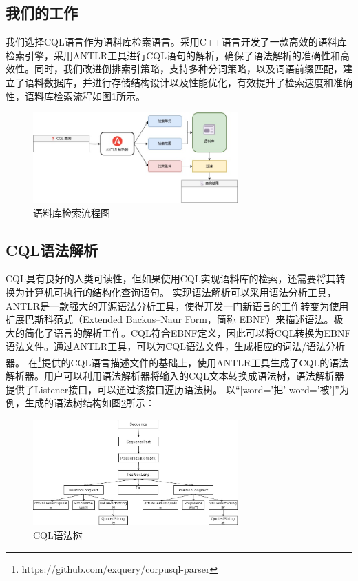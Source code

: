 \documentclass[11pt]{article}
\begin{document}
\begin{CJK*}{UTF8}{gbsn}
\section{我们的工作}

我们选择CQL语言作为语料库检索语言。采用C++语言开发了一款高效的语料库检索引擎，采用ANTLR工具进行CQL语句的解析，确保了语法解析的准确性和高效性。同时，我们改进倒排索引策略，支持多种分词策略，以及词语前缀匹配，建立了语料数据库，并进行存储结构设计以及性能优化，有效提升了检索速度和准确性，语料库检索流程如图\ref{fig:liucheng}所示。

\begin{figure}[!h]
	\centering
	\includegraphics[width=0.7\textwidth]{image/liuchengtu.jpg}
	\caption{语料库检索流程图}
	\label{fig:liucheng}
\end{figure}

\subsection{CQL语法解析}

CQL具有良好的人类可读性，但如果使用CQL实现语料库的检索，还需要将其转换为计算机可执行的结构化查询语句。
实现语法解析可以采用语法分析工具，ANTLR是一款强大的开源语法分析工具，使得开发一门新语言的工作转变为使用扩展巴斯科范式（Extended Backus–Naur Form，简称 EBNF）来描述语法。极大的简化了语言的解析工作。CQL符合EBNF定义，因此可以将CQL转换为EBNF语法文件。通过ANTLR工具，可以为CQL语法文件，生成相应的词法/语法分析器。
在\footnote[1]{https://github.com/exquery/corpusql-parser}提供的CQL语言描述文件的基础上，使用ANTLR工具生成了CQL的语法解析器。用户可以利用语法解析器将输入的CQL文本转换成语法树，语法解析器提供了Listener接口，可以通过该接口遍历语法树。
以“[word='把' \textbar word='被']”为例，生成的语法树结构如图\ref{fig:yufashu}所示：

\begin{figure}[!h]
	\centering
	\includegraphics[width=0.7\textwidth]{image/yufashu.jpg}
	\caption{CQL语法树}
	\label{fig:yufashu}
\end{figure}


\end{CJK*}
\end{document}

